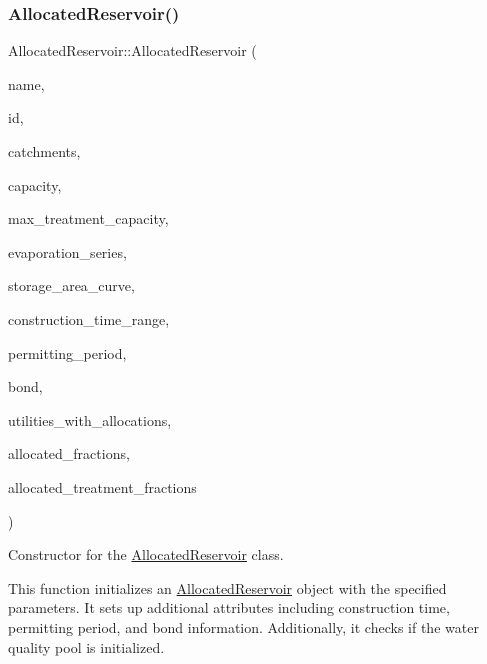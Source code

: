 \subsubsection{\texorpdfstring{Allocated\+Reservoir()}{AllocatedReservoir()}\hspace{0.1cm}{\footnotesize\ttfamily [2/5]}}
{\footnotesize\ttfamily Allocated\+Reservoir\+::\+Allocated\+Reservoir (\begin{DoxyParamCaption}\item[{const char $\ast$}]{name,  }\item[{const int}]{id,  }\item[{const vector$<$ \mbox{\hyperlink{classCatchment}{Catchment}} $\ast$$>$ \&}]{catchments,  }\item[{const double}]{capacity,  }\item[{const double}]{max\+\_\+treatment\+\_\+capacity,  }\item[{\mbox{\hyperlink{classEvaporationSeries}{Evaporation\+Series}} \&}]{evaporation\+\_\+series,  }\item[{\mbox{\hyperlink{classDataSeries}{Data\+Series}} $\ast$}]{storage\+\_\+area\+\_\+curve,  }\item[{const vector$<$ double $>$ \&}]{construction\+\_\+time\+\_\+range,  }\item[{double}]{permitting\+\_\+period,  }\item[{\mbox{\hyperlink{classBond}{Bond}} \&}]{bond,  }\item[{vector$<$ int $>$ $\ast$}]{utilities\+\_\+with\+\_\+allocations,  }\item[{vector$<$ double $>$ $\ast$}]{allocated\+\_\+fractions,  }\item[{vector$<$ double $>$ $\ast$}]{allocated\+\_\+treatment\+\_\+fractions }\end{DoxyParamCaption})}



Constructor for the \mbox{\hyperlink{classAllocatedReservoir}{Allocated\+Reservoir}} class. 

This function initializes an \mbox{\hyperlink{classAllocatedReservoir}{Allocated\+Reservoir}} object with the specified parameters. It sets up additional attributes including construction time, permitting period, and bond information. Additionally, it checks if the water quality pool is initialized.


